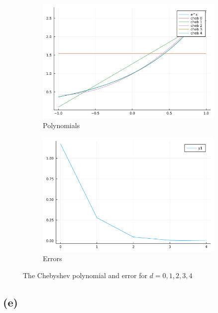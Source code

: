 \documentclass{article}
\newcommand{\1}{\bm 1}
\begin{document}
\begin{figure}[!ht]
    \centering
    \begin{subfigure}[b]{0.48\textwidth}
        \centering
        \includegraphics[width=\textwidth]{polynomial.png}
        \caption{Polynomials}
    \end{subfigure}
    \hfill
    \begin{subfigure}[b]{0.48\textwidth}
        \centering
        \includegraphics[width=\textwidth]{error.png}
        \caption{Errors}
    \end{subfigure}
       \caption{The Chebyshev polynomial and error for $d=0,1,2,3,4$}
\end{figure}

\subsection*{(e)}
\end{document}

